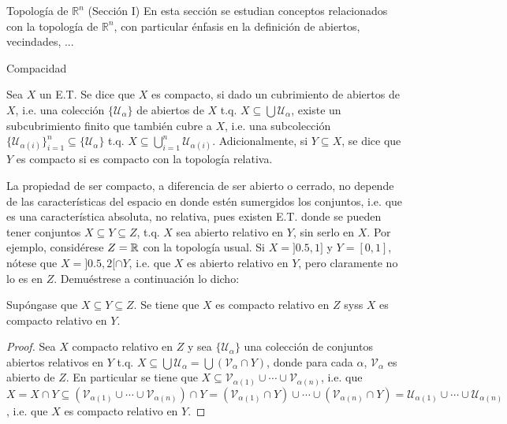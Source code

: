 \begin{chapter}{Topología de $\mathbb{R}^n$ (Sección I)}
En esta sección se estudian conceptos relacionados con la topología de $\mathbb{R}^n$, con particular énfasis en la definición de abiertos, vecindades, ...

\begin{section}{Compacidad}
\begin{defn}
Sea $X$ un E.T. Se dice que $X$ es compacto, si dado un cubrimiento de abiertos de $X$, i.e. una colección $\{\mathcal{U}_\alpha\}$ de abiertos de $X$ t.q. $X\subseteq\bigcup\mathcal{U}_\alpha$, existe un subcubrimiento finito que también cubre a $X$, i.e. una subcolección $\{\mathcal{U}_{\alpha(i)}\}_{i=1}^n\subseteq\{\mathcal{U}_\alpha\}$ t.q. $X\subseteq\bigcup_{i=1}^n\mathcal{U}_{\alpha(i)}$. Adicionalmente, si $Y\subseteq X$, se dice que $Y$ es compacto si es compacto con la topología relativa.
\end{defn}

La propiedad de ser compacto, a diferencia de ser abierto o cerrado, no depende de las características del espacio en donde estén sumergidos los conjuntos, i.e. que es una característica absoluta, no relativa, pues existen E.T. donde se pueden tener conjuntos $X\subseteq Y\subseteq Z$, t.q. $X$ sea abierto relativo en $Y$, sin serlo en $X$. Por ejemplo, considérese $Z=\mathbb{R}$ con la topología usual. Si $X=]0.5,1]$ y $Y=[0,1]$, nótese que $X=]0.5,2[\cap Y$, i.e. que $X$ es abierto relativo en $Y$, pero claramente no lo es en $Z$. Demuéstrese a continuación lo dicho:

\begin{them}
Supóngase que $X\subseteq Y\subseteq Z$. Se tiene que $X$ es compacto relativo en $Z$ syss $X$ es compacto relativo en $Y$.
\end{them}

\begin{proof}
Sea $X$ compacto relativo en $Z$ y sea $\{\mathcal{U}_\alpha\}$ una colección de conjuntos abiertos relativos en $Y$ t.q. $X\subseteq\bigcup\mathcal{U}_\alpha=\bigcup\left(\mathcal{V}_\alpha\cap Y\right)$, donde para cada $\alpha$, $\mathcal{V}_\alpha$ es abierto de $Z$. En particular se tiene que $X\subseteq\mathcal{V}_{\alpha(1)}\cup\cdots\cup\mathcal{V}_{\alpha(n)}$, i.e. que $X=X \cap Y\subseteq(\mathcal{V}_{\alpha(1)}\cup\cdots\cup\mathcal{V}_{\alpha(n)})\cap Y=(\mathcal{V}_{\alpha(1)}\cap Y)\cup\cdots\cup(\mathcal{V}_{\alpha(n)}\cap Y)=\mathcal{U}_{\alpha(1)}\cup\cdots\cup\mathcal{U}_{\alpha(n)}$, i.e. que $X$ es compacto relativo en $Y$.


\end{proof}
\end{section}
\end{chapter}
